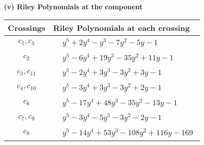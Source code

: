 \documentclass[1p]{elsarticle_modified}
\theoremstyle{definition}
\begin{document}
\newpage\renewcommand{\arraystretch}{1}
\flushleft \textbf{(v) Riley Polynomials at the component}\newline \\
\begin{tabular}{m{50pt}|m{274pt}}
Crossings & \hspace{64pt}Riley Polynomials at each crossing \\
\hline $$\begin{aligned}c_{1},c_{5}\end{aligned}$$&$\begin{aligned}
&y^5+2 y^4- y^3-7 y^2-5 y-1
\end{aligned}$\\
\hline $$\begin{aligned}c_{2}\end{aligned}$$&$\begin{aligned}
&y^5-6 y^4+19 y^3-35 y^2+11 y-1
\end{aligned}$\\
\hline $$\begin{aligned}c_{3},c_{11}\end{aligned}$$&$\begin{aligned}
&y^5-2 y^4+3 y^3-3 y^2+3 y-1
\end{aligned}$\\
\hline $$\begin{aligned}c_{4},c_{10}\end{aligned}$$&$\begin{aligned}
&y^5-3 y^4+3 y^3-3 y^2+2 y-1
\end{aligned}$\\
\hline $$\begin{aligned}c_{6}\end{aligned}$$&$\begin{aligned}
&y^5-17 y^4+48 y^3-35 y^2-13 y-1
\end{aligned}$\\
\hline $$\begin{aligned}c_{7},c_{9}\end{aligned}$$&$\begin{aligned}
&y^5-3 y^4-5 y^3-3 y^2-2 y-1
\end{aligned}$\\
\hline $$\begin{aligned}c_{8}\end{aligned}$$&$\begin{aligned}
&y^5-14 y^4+53 y^3-108 y^2+116 y-169
\end{aligned}$\\
\hline
\end{tabular}\\~\\
\end{document}
